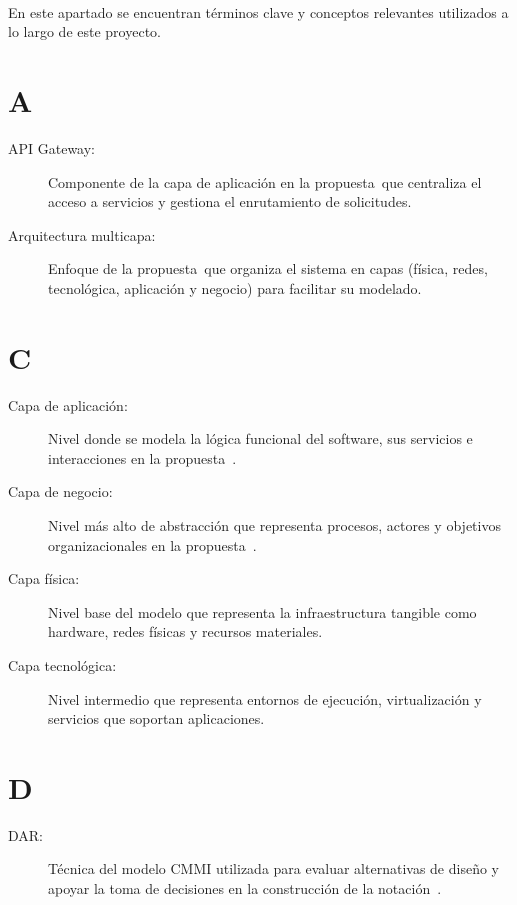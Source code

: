 \label{cap:glosario}
\mbox{}\\
En este apartado se encuentran términos clave y conceptos relevantes utilizados a lo largo de este proyecto.

\section*{A}
\begin{description}
	\item[API Gateway:] Componente de la capa de aplicación en la propuesta~\NDITI que centraliza el acceso a servicios y gestiona el enrutamiento de solicitudes.

	\item[Arquitectura multicapa:] Enfoque de la propuesta~\NDITI que organiza el sistema en capas (física, redes, tecnológica, aplicación y negocio) para facilitar su modelado.
\end{description}

\section*{C}
\begin{description}
	\item[Capa de aplicación:] Nivel donde se modela la lógica funcional del software, sus servicios e interacciones en la propuesta~\NDITI.

	\item[Capa de negocio:] Nivel más alto de abstracción que representa procesos, actores y objetivos organizacionales en la propuesta~\NDITI.

	\item[Capa física:] Nivel base del modelo que representa la infraestructura tangible como hardware, redes físicas y recursos materiales.

	\item[Capa tecnológica:] Nivel intermedio que representa entornos de ejecución, virtualización y servicios que soportan aplicaciones.
\end{description}

\section*{D}
\begin{description}
	\item[DAR:] Técnica del modelo CMMI utilizada para evaluar alternativas de diseño y apoyar la toma de decisiones en la construcción de la notación~\NDITI.
\end{description}

